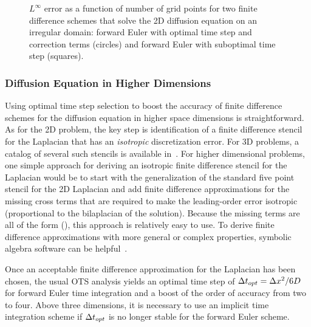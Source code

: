 \documentclass[fleqn,12pt,twoside]{article}
\begin{document}
\begin{figure}[tb]
\begin{center}
\caption{$L^\infty$ error as a function of number of grid points for two
finite difference schemes that solve the 2D diffusion equation on an 
irregular domain: forward Euler with optimal time step and correction 
terms (circles) and forward Euler with suboptimal time step (squares).  
}
\label{fig:diffusion_eqn_2d_starfish_error}
\end{center}
\end{figure}


\subsubsection{Diffusion Equation in Higher Dimensions}
Using optimal time step selection to boost the accuracy of finite difference
schemes for the diffusion equation in higher space dimensions is 
straightforward.  As for the 2D problem, the key step is identification of a 
finite difference stencil for the Laplacian that has an \emph{isotropic} 
discretization error.  For 3D problems, a catalog of several such stencils is 
available in~\cite{patra_2005}.   For higher dimensional problems, one simple
approach for deriving an isotropic finite difference stencil for the Laplacian
would be to start with the generalization of the standard five point stencil
for the 2D Laplacian and add finite difference approximations for the missing 
cross terms that are required to make the leading-order error isotropic 
(\ie proportional to the bilaplacian of the solution).  Because the missing 
terms are all of the form 
\beq
{} \left(\right),
\eeq
this approach is relatively easy to use.  To derive finite difference 
approximations with more general or complex properties, symbolic algebra 
software can be helpful~\cite{patra_2005,gupta_1998}.  

Once an acceptable finite difference approximation for the Laplacian has been 
chosen, the usual OTS analysis yields an optimal time step of 
$\Delta t_{opt} = \Delta x^2/6D$ for forward Euler time integration and a boost of the 
order of accuracy from two to four.  Above three dimensions, it is necessary 
to use an implicit time integration scheme if $\Delta t_{opt}$ is no longer 
stable for the forward Euler scheme.
\end{document}
